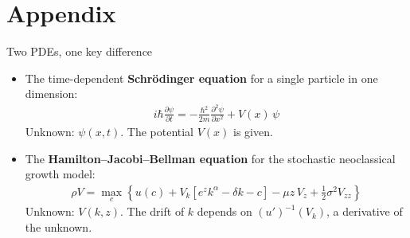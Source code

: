 \documentclass[aspectratio=169,10pt]{beamer}
\newcommand{\emphcolor}[1]{\textbf{\textcolor{emphcolorval}{#1}}}
\begin{document}
\section{Appendix}

\begin{frame}{Two PDEs, one key difference}
	\vspace{0.1in}
	\begin{itemize}
		\item The time-dependent \emphcolor{Schr\"odinger equation} for a single particle in one dimension:
		\begin{align*}
			i\hbar \frac{\partial \psi}{\partial t} = -\frac{\hbar^2}{2m} \frac{\partial^2 \psi}{\partial x^2} + V(x)\, \psi
		\end{align*}
		Unknown: $\psi(x,t)$. The potential $V(x)$ is given.
		\vspace{0.1in}
		\item The \emphcolor{Hamilton--Jacobi--Bellman equation} for the stochastic neoclassical growth model:
		\begin{align*}
			\rho V = \max_c \left\{ u(c) + V_k\!\left[e^z k^\alpha - \delta k - c\right] - \mu z\, V_z + \tfrac{1}{2}\sigma^2 V_{zz} \right\}
		\end{align*}
		Unknown: $V(k,z)$. The drift of $k$ depends on $(u')^{-1}(V_k)$, a derivative of the unknown.
	\end{itemize}
\end{frame}
\end{document}
